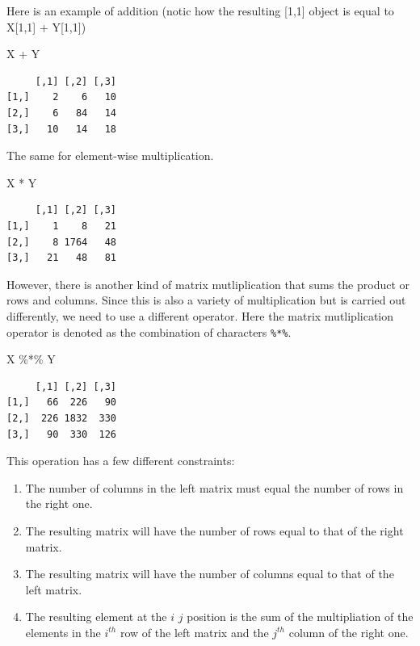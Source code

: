 \documentclass[
  letterpaper,
]{book}
\newenvironment{Shaded}{\begin{snugshade}}{\end{snugshade}}
\newcommand{\NormalTok}[1]{\textcolor[rgb]{0.00,0.23,0.31}{#1}}
\newcommand{\SpecialCharTok}[1]{\textcolor[rgb]{0.37,0.37,0.37}{#1}}
\providecommand{\tightlist}{%
  \setlength{\itemsep}{0pt}\setlength{\parskip}{0pt}}
\begin{document}
Here is an example of addition (notic how the resulting {[}1,1{]} object
is equal to X{[}1,1{]} + Y{[}1,1{]})

\begin{Shaded}
\begin{Highlighting}[]
\NormalTok{X }\SpecialCharTok{+}\NormalTok{ Y}
\end{Highlighting}
\end{Shaded}

\begin{verbatim}
     [,1] [,2] [,3]
[1,]    2    6   10
[2,]    6   84   14
[3,]   10   14   18
\end{verbatim}

The same for element-wise multiplication.

\begin{Shaded}
\begin{Highlighting}[]
\NormalTok{X }\SpecialCharTok{*}\NormalTok{ Y}
\end{Highlighting}
\end{Shaded}

\begin{verbatim}
     [,1] [,2] [,3]
[1,]    1    8   21
[2,]    8 1764   48
[3,]   21   48   81
\end{verbatim}

However, there is another kind of matrix mutliplication that sums the
product or rows and columns. Since this is also a variety of
multiplication but is carried out differently, we need to use a
different operator. Here the matrix mutliplication operator is denoted
as the combination of characters \texttt{\%*\%}.

\begin{Shaded}
\begin{Highlighting}[]
\NormalTok{X }\SpecialCharTok{\%*\%}\NormalTok{ Y}
\end{Highlighting}
\end{Shaded}

\begin{verbatim}
     [,1] [,2] [,3]
[1,]   66  226   90
[2,]  226 1832  330
[3,]   90  330  126
\end{verbatim}

This operation has a few different constraints:

\begin{enumerate}
\def\labelenumi{\arabic{enumi}.}
\tightlist
\item
  The number of columns in the left matrix must equal the number of rows
  in the right one.
\item
  The resulting matrix will have the number of rows equal to that of the
  right matrix.
\item
  The resulting matrix will have the number of columns equal to that of
  the left matrix.
\item
  The resulting element at the \(i\) \(j\) position is the sum of the
  multipliation of the elements in the \(i^{th}\) row of the left matrix
  and the \(j^{th}\) column of the right one.
\end{enumerate}
\end{document}
